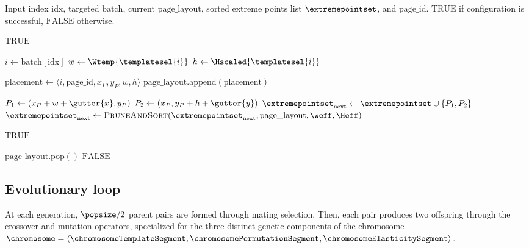 \begin{algorithm}[h]
\caption{Recursive Spatial Placement Solver (\textsc{SolveRecursive})}
\label{alg:solve_recursive}
\begin{algorithmic}[1]
\REQUIRE Input index $\text{idx}$, targeted $\text{batch}$, current $\text{page\_layout}$, sorted extreme points list $\extremepointset$, and $\text{page\_id}$.
\ENSURE $\text{TRUE}$ if configuration is successful, $\text{FALSE}$ otherwise.

    \STATE \RETURN $\text{TRUE}$ 
\ENDIF

\STATE $i \leftarrow \text{batch}[\text{idx}]$
\STATE $w \leftarrow \Wtemp{\templatesel{i}}$
\STATE $h \leftarrow \Hscaled{\templatesel{i}}$

            \STATE $\text{placement} \leftarrow \langle i, \text{page\_id}, x_P, y_P, w, h \rangle$
            \STATE $\text{page\_layout}.\text{append}(\text{placement})$

            \STATE $P_1 \leftarrow (x_P + w + \gutter{x}, y_P)$
            \STATE $P_2 \leftarrow (x_P, y_P + h + \gutter{y})$
            \STATE $\extremepointset_{\text{next}} \leftarrow \extremepointset \cup \{P_1, P_2\}$
            \STATE $\extremepointset_{\text{next}} \leftarrow \textsc{PruneAndSort}(\extremepointset_{\text{next}}, \text{page\_layout}, \Weff, \Heff)$

                \STATE \RETURN $\text{TRUE}$
            \ENDIF

            \STATE $\text{page\_layout}.\text{pop}()$ 
        \ENDIF
    \ENDIF
\ENDFOR
\RETURN $\text{FALSE}$
\end{algorithmic}
\end{algorithm}

\subsection{Evolutionary loop}
\label{sec:evolutionary_operators}

At each generation, $\popsize/2$ parent pairs are formed through mating selection. Then, each pair produces two offspring through the crossover and mutation operators, specialized for the three distinct genetic components of the chromosome $\chromosome = \langle \chromosomeTemplateSegment, \chromosomePermutationSegment, \chromosomeElasticitySegment \rangle$.

